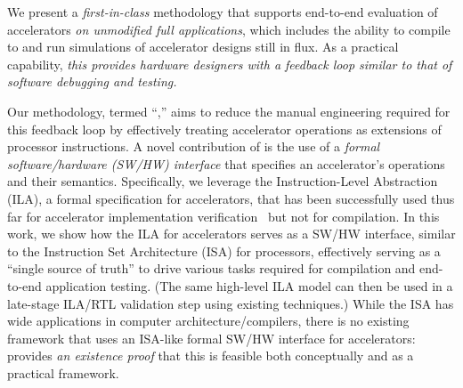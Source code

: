 We present a \emph{first-in-class} methodology 
  that supports
  end-to-end evaluation of accelerators
  {\it on unmodified full applications},
  which includes the ability to compile to
  and run simulations
  of 
  accelerator designs still in flux.
As a practical capability,
  \textit{
  this provides hardware designers with a feedback loop 
  similar to that of software debugging and testing.
  }

Our methodology,
  termed ``\TLA,'' %
  aims to reduce the manual engineering required for this feedback loop by effectively treating accelerator operations as extensions of processor instructions. 
  A novel contribution of \TLA is the use of a \emph{formal software/hardware (SW/HW) interface} that specifies an accelerator's
  operations and their semantics. Specifically, we leverage the Instruction-Level Abstraction (ILA), a formal specification for accelerators, that has been successfully used thus far for accelerator implementation verification~\cite{huang2018instruction} but not for compilation. In this work, we show how the ILA for accelerators serves as a SW/HW interface, similar to the Instruction Set Architecture (ISA) for processors, effectively serving as a ``single source of truth'' to drive various %
  tasks required for compilation and end-to-end application testing. (The same high-level ILA model can then be used in a late-stage ILA/RTL validation step using existing techniques.) While the ISA has wide applications in computer architecture/compilers, there is no existing framework that uses an ISA-like formal SW/HW interface for accelerators: {\TLA} provides \emph{an existence proof} that this is feasible both conceptually and as a practical framework. 
  
  
